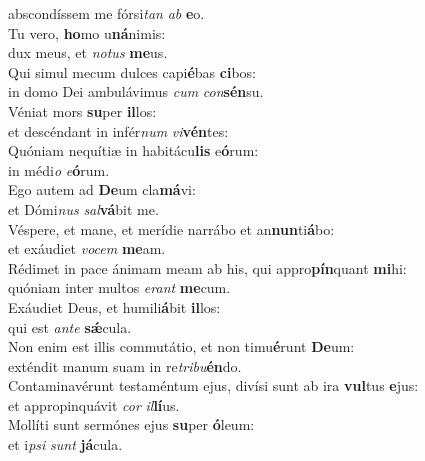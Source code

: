 \oddverse abscondíssem me fórsi\textit{tan} \textit{ab} \textbf{e}o.\\
\evenverse Tu vero, \textbf{ho}mo u\textbf{ná}nimis:~\*\\
\evenverse dux meus, et \textit{no}\textit{tus} \textbf{me}us.\\
\oddverse Qui simul mecum dulces capi\textbf{é}bas \textbf{ci}bos:~\*\\
\oddverse in domo Dei ambulávimus \textit{cum} \textit{con}\textbf{sén}su.\\
\evenverse Véniat mors \textbf{su}per \textbf{il}los:~\*\\
\evenverse et descéndant in infér\textit{num} \textit{vi}\textbf{vén}tes:\\
\oddverse Quóniam nequítiæ in habitácu\textbf{lis} e\textbf{ó}rum:~\*\\
\oddverse in médi\textit{o} \textit{e}\textbf{ó}rum.\\
\evenverse Ego autem ad \textbf{De}um cla\textbf{má}vi:~\*\\
\evenverse et Dómi\textit{nus} \textit{sal}\textbf{vá}bit me.\\
\oddverse Véspere, et mane, et merídie narrábo et an\textbf{nun}ti\textbf{á}bo:~\*\\
\oddverse et exáudiet \textit{vo}\textit{cem} \textbf{me}am.\\
\evenverse Rédimet in pace ánimam meam ab his, qui appro\textbf{pín}quant \textbf{mi}hi:~\*\\
\evenverse quóniam inter multos \textit{e}\textit{rant} \textbf{me}cum.\\
\oddverse Exáudiet Deus, et humili\textbf{á}bit \textbf{il}los:~\*\\
\oddverse qui est \textit{an}\textit{te} \textbf{sǽ}cula.\\
\evenverse Non enim est illis commutátio, et non timu\textbf{é}runt \textbf{De}um:~\*\\
\evenverse exténdit manum suam in re\textit{tri}\textit{bu}\textbf{én}do.\\
\oddverse Contaminavérunt testaméntum ejus, divísi sunt ab ira \textbf{vul}tus \textbf{e}jus:~\*\\
\oddverse et appropinquávit \textit{cor} \textit{il}\textbf{lí}us.\\
\evenverse Mollíti sunt sermónes ejus \textbf{su}per \textbf{ó}leum:~\*\\
\evenverse et i\textit{psi} \textit{sunt} \textbf{já}cula.\\
